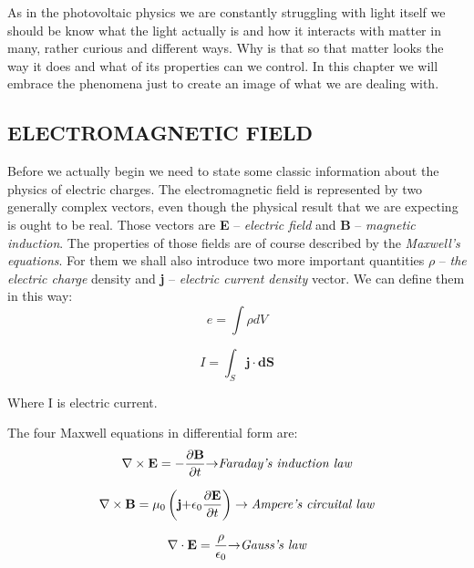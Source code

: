 As in the photovoltaic physics we are constantly struggling with light itself we should be know what the light actually is and how it interacts with matter in many, rather curious and different ways. Why is that so that matter looks the way it does and what of its properties can we control. In this chapter we will embrace the phenomena just to create an image of what we are dealing with. 

\subsection{ELECTROMAGNETIC FIELD}

\indent Before we actually begin we need to state some classic information about
the physics of electric charges. The electromagnetic field is
represented by two generally complex vectors, even though the physical
result that we are expecting is ought to be real. Those vectors are
\textbf{E} -- \emph{electric field} and \textbf{B} -- \emph{magnetic
induction}. The properties of those fields are of course described by
the \emph{Maxwell's equations}. For them we shall also introduce two
more important quantities \(\rho\) -- \emph{the electric charge} density
and \textbf{j} -- \emph{electric current density} vector.
We can define them in this way:
\begin{equation}
e = \int\rho dV
\end{equation}

\begin{equation}
I = \int_{S}^{}\mathbf{j \cdot dS}
\end{equation}

\noindent Where I is electric current.

\noindent The four Maxwell equations in differential form are:
\begin{equation}
\nabla \times \mathbf{E} = -\frac{\partial\mathbf{B}}{\partial t}\mathbf{\rightarrow}
\emph{Faraday's induction law}
\end{equation}

\begin{equation}
\nabla \times \mathbf{B}=\mu_{0}\left( \mathbf{j +}\epsilon_{0}\frac{\partial\mathbf{E}}{\partial t} \right) \rightarrow
\emph{Ampere's circuital law}
\end{equation}

\begin{equation}
\nabla \cdot \mathbf{E}=\frac{\rho}{\epsilon_{0}}\mathbf{\rightarrow}
\emph{Gauss's law}
\end{equation}


